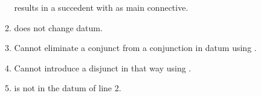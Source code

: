 \begin{enumerate}
\begin{enumerate}
\begin{argumentN}[1]
\end{argumentN}

\opts{
 \dotline
 \dotline
}
{\conjI{} results in a succedent with \p{\land} as main connective.}

\item 
\begin{argumentN}[1]



\end{argumentN}

\opts{
 \dotline
 \dotline
}
{\disjI{} does not change datum.}

\item 
\begin{argumentN}[1]



\end{argumentN}

\opts{

 \dotline
 \dotline
}
{
Cannot eliminate a conjunct from a conjunction in datum using \conjE{}.}

\item 
\begin{argumentN}[1]



\end{argumentN}

\opts{

 \dotline
 \dotline
}
{Cannot introduce a disjunct in that way using \disjI.}

\item 
\begin{argumentN}[1]




\end{argumentN}


\opts{

 \dotline
 \dotline
}
{ is not in the datum of line 2.}


\end{enumerate}
\end{enumerate}
